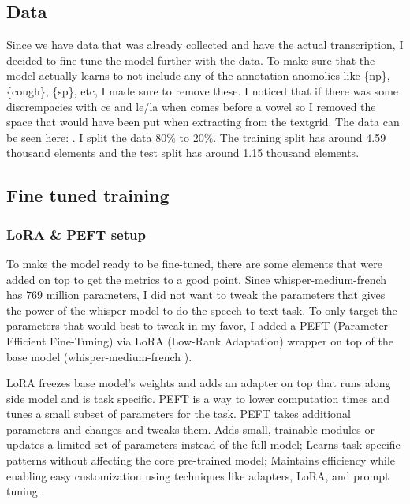 \documentclass[12pt]{article}
\begin{document}
    \subsection{Data}
    Since we have data that was already collected and have the actual transcription,
    I decided to fine tune the model further with the data. To make sure that the
    model actually learns to not include any of the annotation anomolies like \{np\},
    \{cough\}, \{sp\}, etc, I made sure to remove these. I noticed that if there
    was some discrempacies with ce and le/la when comes before a vowel so I
    removed the space that would have been put when extracting from the textgrid.
    The data can be seen here: \citet{lookitsluc1-french-cleer-speech}. I split
    the data $80\%$ to $20\%$. The training split has around 4.59 thousand elements
    and the test split has around 1.15 thousand elements.

    \subsection{Fine tuned training}
    \subsubsection{LoRA \& PEFT setup}
    To make the model ready to be fine-tuned, there are some elements that were
    added on top to get the metrics to a good point. Since whisper-medium-french \citep{huang2022whisper-medium-french}
    has $769$ million parameters, I did not want to tweak the parameters that gives
    the power of the whisper model to do the speech-to-text task. To only target
    the parameters that would best to tweak in my favor, I added a PEFT (Parameter-Efficient
    Fine-Tuning) via LoRA (Low-Rank Adaptation) wrapper on top of the base model (whisper-medium-french
    \citep{huang2022whisper-medium-french}).

    LoRA freezes base model’s weights and adds an adapter on top that runs along
    side model and is task specific. PEFT is a way to lower computation times and
    tunes a small subset of parameters for the task. PEFT takes additional
    parameters and changes and tweaks them. Adds small, trainable modules or
    updates a limited set of parameters instead of the full model; Learns task-specific
    patterns without affecting the core pre-trained model; Maintains efficiency
    while enabling easy customization using techniques like adapters, LoRA, and
    prompt tuning \citep{geeksforgeeks_peft}.
\end{document}
